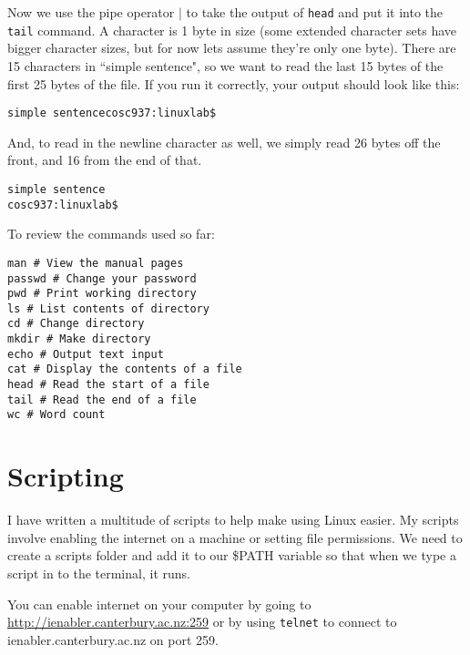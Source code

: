 \documentclass{article}
\begin{document}
\begin{enumerate}
Now we use the pipe operator $|$ to take the output of \texttt{head} and put it into the \texttt{tail} command. A character is 1 byte in size (some extended character sets have bigger character sizes, but for now lets assume they're only one byte). There are 15 characters in ``simple sentence", so we want to read the last 15 bytes of the first 25 bytes of the file. If you run it correctly, your output should look like this:
\begin{verbatim}
simple sentencecosc937:linuxlab$
\end{verbatim}
And, to read in the newline character as well, we simply read 26 bytes off the front, and 16 from the end of that.
\begin{verbatim}
simple sentence
cosc937:linuxlab$ 
\end{verbatim}
\end{enumerate}
To review the commands used so far:
\begin{verbatim}
man # View the manual pages
passwd # Change your password 
pwd # Print working directory 
ls # List contents of directory 
cd # Change directory 
mkdir # Make directory 
echo # Output text input 
cat # Display the contents of a file 
head # Read the start of a file 
tail # Read the end of a file 
wc # Word count 
\end{verbatim}

\section{Scripting}
I have written a multitude of scripts to help make using Linux easier. My scripts involve enabling the internet on a machine or setting file permissions. We need to create a scripts folder and add it to our \$PATH variable so that when we type a script in to the terminal, it runs.

You can enable internet on your computer by going to \url{http://ienabler.canterbury.ac.nz:259} or by using \texttt{telnet} to connect to ienabler.canterbury.ac.nz on port 259.
\end{document}
